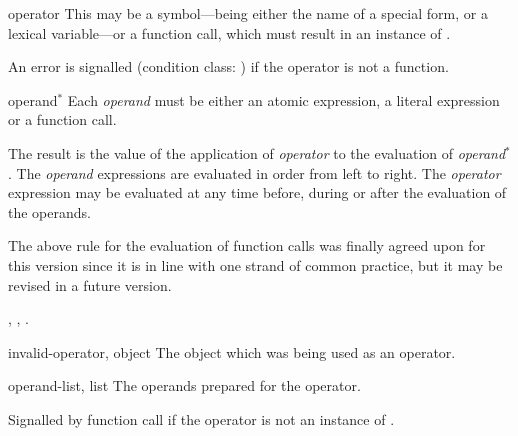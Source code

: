 \begin{optDefinition}
%
\Syntax
{}%
%
\begin{arguments}
    \item[operator] This may be a symbol---being either the name of a special
    form, or a lexical variable---or a function call, which must result in an
    instance of .

    An error is signalled (condition class:
    ) if the
    operator is not a function.

    \item[operand\/$^*$] Each {\em operand} must be either an atomic expression,
    a literal expression or a function call.
\end{arguments}
%
\result%
The result is the value of the application of {\em operator} to the
evaluation of {\em operand\/$^*$}.
%
\remarks%
The {\em operand} expressions are evaluated in order from left to
right.  The {\em operator} expression may be evaluated at any time
before, during or after the evaluation of the operands.
%
\begin{note}
    The above rule for the evaluation of function calls was finally agreed upon
    for this version since it is in line with one strand of common practice, but
    it may be revised in a future version.
\end{note}
%
\seealso%
, , .

%
\begin{initoptions}
    \item[invalid-operator, object] The object which was being used as an
    operator.

    \item[operand-list, list] The operands prepared for the operator.
\end{initoptions}
%
\remarks%
Signalled by function call if the operator is not an instance of
.


\end{optDefinition}
